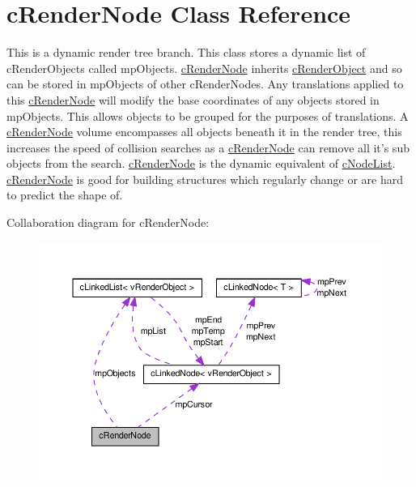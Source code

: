 \hypertarget{classc_render_node}{
\section{cRenderNode Class Reference}
\label{classc_render_node}
}


This is a dynamic render tree branch. This class stores a dynamic list of cRenderObjects called mpObjects. \hyperlink{classc_render_node}{cRenderNode} inherits \hyperlink{classc_render_object}{cRenderObject} and so can be stored in mpObjects of other cRenderNodes. Any translations applied to this \hyperlink{classc_render_node}{cRenderNode} will modify the base coordinates of any objects stored in mpObjects. This allows objects to be grouped for the purposes of translations. A \hyperlink{classc_render_node}{cRenderNode} volume encompasses all objects beneath it in the render tree, this increases the speed of collision searches as a \hyperlink{classc_render_node}{cRenderNode} can remove all it's sub objects from the search. \hyperlink{classc_render_node}{cRenderNode} is the dynamic equivalent of \hyperlink{classc_node_list}{cNodeList}. \hyperlink{classc_render_node}{cRenderNode} is good for building structures which regularly change or are hard to predict the shape of.  




Collaboration diagram for cRenderNode:\nopagebreak
\begin{figure}[H]
\begin{center}
\leavevmode
\includegraphics[width=397pt]{classc_render_node__coll__graph}
\end{center}
\end{figure}
